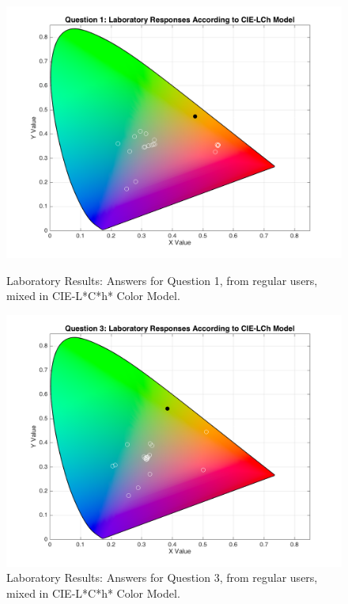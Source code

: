 \begin{figure}[htbp]
  \centering
  \begin{minipage}{0.3\textwidth}
    \centering
    \includegraphics[width=\textwidth]{images/1_lab_LChresponses.png}
    \caption[Laboratory Results: Answers for Question 1, from regular users, mixed in CIE-L*C*h* Color Model.]{Laboratory Results: Answers for Question 1, from regular users, mixed in CIE-L*C*h* Color Model.}
    \label{fig:lablchregular_1}
  \end{minipage}\hfill
  \begin{minipage}{0.3\textwidth}
    \centering
    \includegraphics[width=\textwidth]{images/3_lab_LChresponses.png}
    \caption[Laboratory Results: Answers for Question 3, from regular users, mixed in CIE-L*C*h* Color Model.]{Laboratory Results: Answers for Question 3, from regular users, mixed in CIE-L*C*h* Color Model.}

\end{minipage}
\end{figure}
